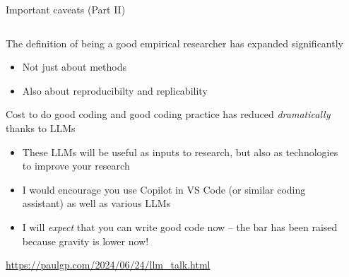 \documentclass[notes,11pt, aspectratio=169]{beamer}
\newenvironment{wideitemize}{\itemize\addtolength{\itemsep}{10pt}}{\enditemize}
\begin{document}
\begin{frame}{Important caveats (Part II)}
  \begin{columns}[T] %
  \begin{column}{.7\textwidth}
    \begin{wideitemize}
    \item The definition of being a good empirical researcher has expanded significantly
      \begin{itemize}
        \item Not just about methods
        \item Also about reproducibilty and replicability
      \end{itemize}
    \item Cost to do good coding and good coding practice has reduced \emph{dramatically} thanks to LLMs
      \begin{itemize}
        \item These LLMs will be useful as inputs to research, but also as technologies to improve your research
        \item I would encourage you use Copilot in VS Code (or similar coding assistant) as well as various LLMs
        \item I will \emph{expect} that you can write good code now -- the bar has been raised because gravity is lower now!
      \end{itemize}
    \end{wideitemize}
    \url{https://paulgp.com/2024/06/24/llm_talk.html}
  \end{column}%
  \hfill%
  \begin{column}{.28\textwidth}
  \end{column}%
  \end{columns}
  \end{frame}
  
\end{document}

